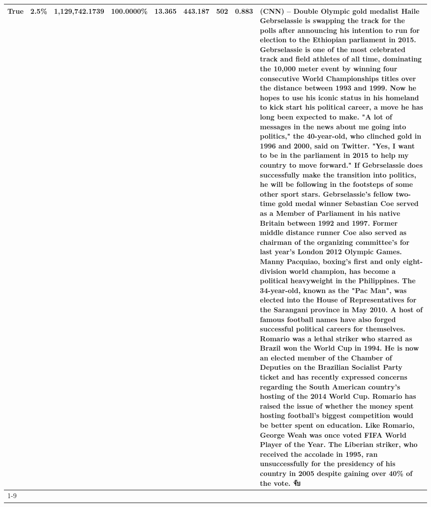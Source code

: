 \begin{table}[H]
{\begin{tabular}{lllrlllll}
True & 2.5\% & 1,129,742.1739 & \bfseries \color{red} 100.0000\% & 13.365 & 443.187 & 502 & 0.883 & (CNN) -- Double Olympic gold medalist Haile Gebrselassie is swapping the track for the polls after announcing his intention to run for election to the Ethiopian parliament in 2015. Gebrselassie is one of the most celebrated track and field athletes of all time, dominating the 10,000 meter event by winning four consecutive World Championships titles over the distance between 1993 and 1999. Now he hopes to use his iconic status in his homeland to kick start his political career, a move he has long been expected to make. "A lot of messages in the news about me going into politics," the 40-year-old, who clinched gold in 1996 and 2000, said on Twitter. "Yes, I want to be in the parliament in 2015 to help my country to move forward." If Gebrselassie does successfully make the transition into politics, he will be following in the footsteps of some other sport stars. Gebrselassie's fellow two-time gold medal winner Sebastian Coe served as a Member of Parliament in his native Britain between 1992 and 1997. Former middle distance runner Coe also served as chairman of the organizing committee's for last year's London 2012 Olympic Games. Manny Pacquiao, boxing's first and only eight-division world champion, has become a political heavyweight in the Philippines. The 34-year-old, known as the "Pac Man", was elected into the House of Representatives for the Sarangani province in May 2010. A host of famous football names have also forged successful political careers for themselves. Romario was a lethal striker who starred as Brazil won the World Cup in 1994. He is now an elected member of the Chamber of Deputies on the Brazilian Socialist Party ticket and has recently expressed concerns regarding the South American country's hosting of the 2014 World Cup. Romario has raised the issue of whether the money spent hosting football's biggest competition would be better spent on education. Like Romario, George Weah was once voted FIFA World Player of the Year. The Liberian striker, who received the accolade in 1995, ran unsuccessfully for the presidency of his country in 2005 despite gaining over 40\% of the vote. จับ \\
\cline{1-9}

\end{tabular}}
\end{table}
